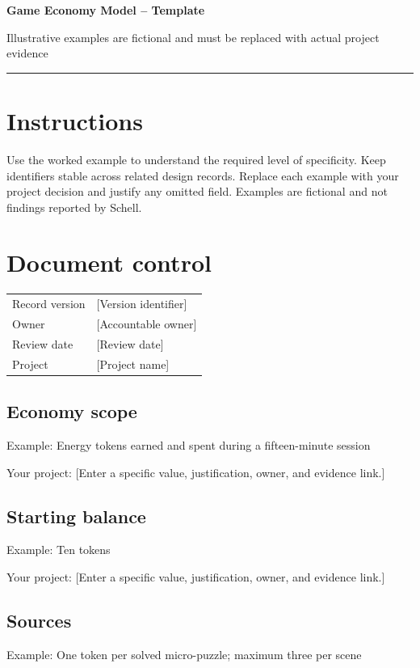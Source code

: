 \documentclass[11pt]{article}
\begin{document}
{\huge\bfseries\color{suiteblue} Game Economy Model -- Template}\par
\vspace{0.15in}
{\normalsize\color{suitegray} Illustrative examples are fictional and must be replaced with actual project evidence}\par
\vspace{0.15in}\hrule\vspace{0.15in}

\section{Instructions}
Use the worked example to understand the required level of specificity. Keep identifiers stable across related design records. Replace each example with your project decision and justify any omitted field. Examples are fictional and not findings reported by Schell.


\section{Document control}
\begin{tabularx}{\linewidth}{@{}lX@{}}\toprule Record version & [Version identifier]\\ Owner & [Accountable owner]\\ Review date & [Review date]\\ Project & [Project name]\\\bottomrule\end{tabularx}

\subsection{Economy scope}
Example: Energy tokens earned and spent during a fifteen-minute session

Your project: [Enter a specific value, justification, owner, and evidence link.]


\subsection{Starting balance}
Example: Ten tokens

Your project: [Enter a specific value, justification, owner, and evidence link.]


\subsection{Sources}
Example: One token per solved micro-puzzle; maximum three per scene
\end{document}
